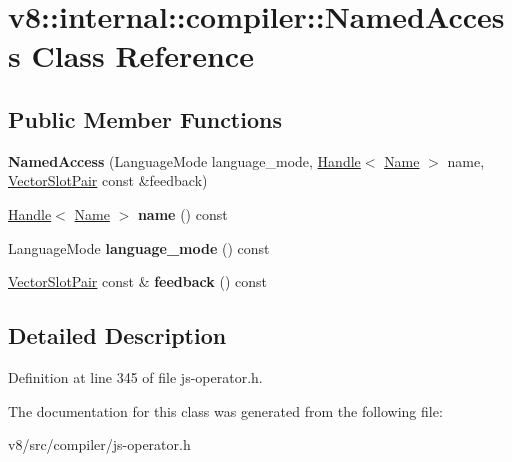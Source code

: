 \hypertarget{classv8_1_1internal_1_1compiler_1_1NamedAccess}{}\section{v8\+:\+:internal\+:\+:compiler\+:\+:Named\+Access Class Reference}
\label{classv8_1_1internal_1_1compiler_1_1NamedAccess}
\subsection*{Public Member Functions}
\begin{DoxyCompactItemize}
\item 
\mbox{\label{classv8_1_1internal_1_1compiler_1_1NamedAccess_acfd25bf8ed99186b032bdfd35b57a6ee}} 
{\bfseries Named\+Access} (Language\+Mode language\+\_\+mode, \mbox{\hyperlink{classv8_1_1internal_1_1Handle}{Handle}}$<$ \mbox{\hyperlink{classv8_1_1internal_1_1Name}{Name}} $>$ name, \mbox{\hyperlink{classv8_1_1internal_1_1VectorSlotPair}{Vector\+Slot\+Pair}} const \&feedback)
\item 
\mbox{\label{classv8_1_1internal_1_1compiler_1_1NamedAccess_ae1007d90b3ec30095adeafa794a9ad23}} 
\mbox{\hyperlink{classv8_1_1internal_1_1Handle}{Handle}}$<$ \mbox{\hyperlink{classv8_1_1internal_1_1Name}{Name}} $>$ {\bfseries name} () const
\item 
\mbox{\label{classv8_1_1internal_1_1compiler_1_1NamedAccess_ac264327890476e06ef65ba9200c7452f}} 
Language\+Mode {\bfseries language\+\_\+mode} () const
\item 
\mbox{\label{classv8_1_1internal_1_1compiler_1_1NamedAccess_a1b5dbc620f4761f32649be8f9901ee98}} 
\mbox{\hyperlink{classv8_1_1internal_1_1VectorSlotPair}{Vector\+Slot\+Pair}} const  \& {\bfseries feedback} () const
\end{DoxyCompactItemize}


\subsection{Detailed Description}


Definition at line 345 of file js-\/operator.\+h.



The documentation for this class was generated from the following file\+:\begin{DoxyCompactItemize}
\item 
v8/src/compiler/js-\/operator.\+h\end{DoxyCompactItemize}
